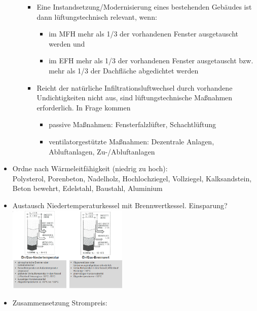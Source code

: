 \documentclass[fleqn,twoside,dvipsnames]{article}
\begin{document}
\begin{itemize}
\begin{itemize}
\begin{itemize}
                            \item Eine Instandsetzung/Modernisierung eines bestehenden Gebäudes ist dann lüftungstechnisch relevant, wenn:
                                \begin{itemize}
                                    \item im MFH mehr als 1/3 der vorhandenen Fenster ausgetauscht werden und
                                    \item im EFH mehr als 1/3 der vorhandenen Fenster ausgetauscht bzw. mehr als 1/3 der Dachfläche abgedichtet werden
                                \end{itemize}
                            \item Reicht der natürliche Infiltrationsluftwechsel durch vorhandene Undichtigkeiten nicht aus, sind lüftungstechnische Maßnahmen erforderlich. In Frage kommen
                                \begin{itemize}
                                    \item passive Maßnahmen: Fensterfalzlüfter, Schachtlüftung
                                    \item ventilatorgestützte Maßnahmen: Dezentrale Anlagen, Abluftanlagen, Zu-/Abluftanlagen
                                \end{itemize}
                        \end{itemize}
                \end{itemize}
            \item Ordne nach Wärmeleitfähigkeit (niedrig zu hoch):\\ 
            Polysterol, Porenbeton, Nadelholz, Hochlochziegel, Vollziegel, Kalksandstein, Beton bewehrt, Edelstahl, Baustahl, Aluminium 
            \item Austausch Niedertemperaturkessel mit Brennwertkessel. Einsparung?\\
                \includegraphics[width=0.45\textwidth]{Grafiken/ES/Niedertemp.-Heizkessel vs Brennwertkessel.png}
            \item Zusammensetzung Strompreis:

\end{itemize}
\end{document}
